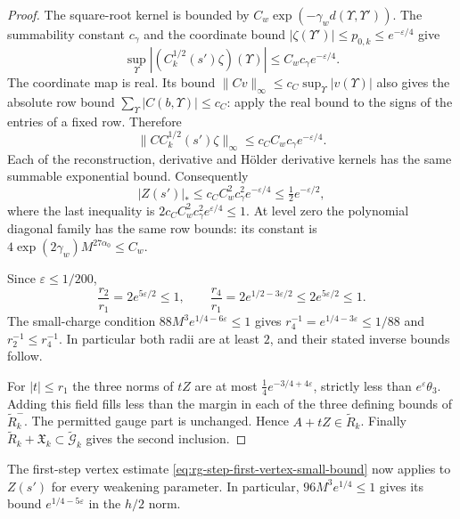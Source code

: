 \begin{proof}
The square-root kernel is bounded by
$C_w\exp(-\gamma_w d(\Upsilon,\Upsilon'))$.
The summability constant $c_\gamma$ and
the coordinate bound $|\zeta(\Upsilon')|\le p_{0,k}
\le e^{-\varepsilon/4}$ give
\[
 \sup_\Upsilon|(C_k^{1/2}(s')\zeta)(\Upsilon)|
                                      \le C_wc_\gamma e^{-\varepsilon/4}.
\]
The coordinate map is real. Its bound
$\|Cv\|_\infty\le c_C\sup_\Upsilon|v(\Upsilon)|$
also gives the absolute row bound
$\sum_\Upsilon|C(b,\Upsilon)|\le c_C$:
apply the real bound to the signs of the entries of a fixed
row. Therefore
\[
 \|CC_k^{1/2}(s')\zeta\|_\infty
                                  \le c_CC_wc_\gamma e^{-\varepsilon/4}.
\]
Each of the reconstruction, derivative and H\"older derivative
kernels has the same summable exponential bound. Consequently
\[
 |Z(s')|_*\le c_CC_w^2c_\gamma^2 e^{-\varepsilon/4}
                                          \le\tfrac12 e^{-\varepsilon/2},
\]
where the last inequality is
$2c_CC_w^2c_\gamma^2e^{\varepsilon/4}\le1$.
At level zero the polynomial diagonal family has the same
row bounds: its constant is
$4\exp(2\gamma_w)M^{27\alpha_0}\le C_w$.

Since $\varepsilon\le1/200$,
\[
 \frac{r_2}{r_1}=2e^{5\varepsilon/2}\le1,\qquad
 \frac{r_4}{r_1}=2e^{1/2-3\varepsilon/2}
                                      \le2e^{5\varepsilon/2}\le1.
\]
The small-charge condition
$88M^3e^{1/4-6\varepsilon}\le1$ gives
$r_4^{-1}=e^{1/4-3\varepsilon}\le1/88$ and
$r_2^{-1}\le r_4^{-1}$.
In particular both radii are at least $2$, and their stated
inverse bounds follow.

For $|t|\le r_1$ the three norms of $tZ$ are at most
$\frac14e^{-3/4+4\varepsilon}$, strictly less than
$e^\varepsilon\theta_3$. Adding this field fills less than the
margin in each of the three defining bounds of
$\widetilde R_k^-$. The permitted gauge part is unchanged.
Hence $A+tZ\in\widetilde R_k$.
Finally $\widetilde R_k+\mathfrak X_k
\subset\widetilde{\mathcal G}_k$ gives the second inclusion.
\end{proof}
The first-step vertex estimate
\eqref{eq:rg-step-first-vertex-small-bound} now applies to
$Z(s')$ for every weakening parameter. In particular,
$96M^3e^{1/4}\le1$ gives its bound
$e^{1/4-5\varepsilon}$ in the $h/2$ norm.

